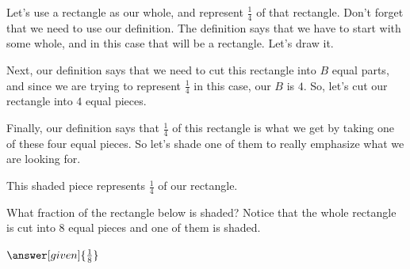 \documentclass{ximera}
\begin{document}
\begin{example}
Let's use a rectangle as our whole, and represent $\frac{1}{4}$ of that rectangle. Don't forget that we need to use our definition. The definition says that we have to start with some whole, and in this case that will be a rectangle. Let's draw it.

\begin{image}
\end{image}

Next, our definition says that we need to cut this rectangle into $B$ equal parts, and since we are trying to represent $\frac{1}{4}$ in this case, our $B$ is $4$.  So, let's cut our rectangle into $4$ equal pieces.

\begin{image}
\end{image}

Finally, our definition says that $\frac{1}{4}$ of this rectangle is what we get by taking one of these four equal pieces. So let's shade one of them to really emphasize what we are looking for.

\begin{image}
\end{image}

This shaded piece represents $\frac{1}{4}$ of our rectangle.

\end{example}

\begin{question}
What fraction of the rectangle below is shaded? Notice that the whole rectangle is cut into $8$ equal pieces and one of them is shaded.
\begin{image}
\end{image}

\begin{prompt}
$\answer[given]{\frac{1}{8}}$
\end{prompt}
\end{question}
\end{document}
